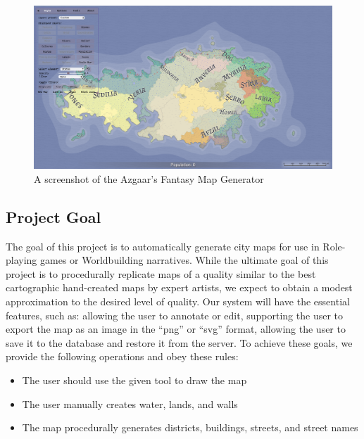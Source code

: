 \begin{figure}[htb]
\centering
\includegraphics[width=\textwidth]{section01/assets/screenshot_FMG.png}
\caption[A screenshot of the Azgaar's Fantasy Map Generator]{\label{Screenshot FMG}A screenshot of the Azgaar's Fantasy Map Generator}
\end{figure}

\subsection{Project Goal}
The goal of this project is to automatically generate city maps for use in Role-playing games or Worldbuilding narratives. While the ultimate goal of this project is to procedurally replicate maps of a quality similar to the best cartographic hand-created maps by expert artists, we expect to obtain a modest approximation to the desired level of quality. Our system will have the essential features, such as: allowing the user to annotate or edit, supporting the user to export the map as an image in the ``png'' or ``svg'' format, allowing the user to save it to the database and restore it from the server. To achieve these goals, we provide the following operations and obey these rules:
\begin{itemize}
  \item The user should use the given tool to draw the map
  \item The user manually creates water, lands, and walls
  \item The map procedurally generates districts, buildings, streets, and street names
\end{itemize}

